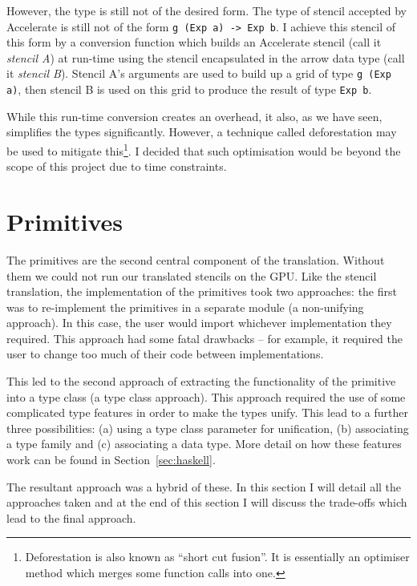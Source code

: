 \documentclass[12pt,a4paper,twoside]{scrbook}
\begin{document}
However, the type is still not of the desired form. The type of stencil accepted
by Accelerate is still not of the form \texttt{g (Exp a) -\textgreater{} Exp
  b}. I achieve this stencil of this form by a conversion function which builds
an Accelerate stencil (call it \emph{stencil A}) at run-time using the stencil
encapsulated in the arrow data type (call it \emph{stencil B}). Stencil A's
arguments are used to build up a grid of type \texttt{g (Exp a)}, then stencil B
is used on this grid to produce the result of type \texttt{Exp b}.

While this run-time conversion creates an overhead, it also, as we have
seen, simplifies the types significantly. However, a technique called
deforestation may be used to mitigate this\footnote{Deforestation is also known
  as ``short cut fusion''. It is essentially an optimiser method which merges
  some function calls into one.}. I decided that such optimisation would be
beyond the scope of this project due to time constraints.

\section{Primitives}
\label{sec:prims}

The primitives are the second central component of the translation.  Without
them we could not run our translated stencils on the GPU. Like the stencil
translation, the implementation of the primitives took two approaches: the first
was to re-implement the primitives in a separate module (a non-unifying
approach). In this case, the user would import whichever implementation they
required. This approach had some fatal drawbacks -- for example, it required the
user to change too much of their code between implementations.

This led to the second approach of extracting the functionality of the primitive
into a type class (a type class approach). This approach required the use of
some complicated type features in order to make the types unify. This lead to a
further three possibilities: (a) using a type class parameter for unification,
(b) associating a type family and (c) associating a data type. More detail on
how these features work can be found in Section~\ref{sec:haskell}.

The resultant approach was a hybrid of these. In this section I will detail all
the approaches taken and at the end of this section I will discuss the
trade-offs which lead to the final approach.
\end{document}
